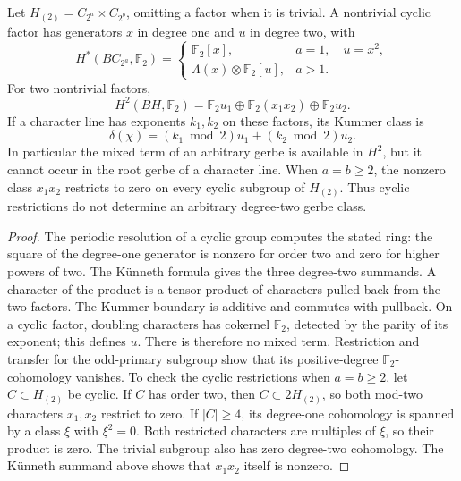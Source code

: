 \begin{proposition}
\label{prop:finite-stabilizer-two-primary-class}
\label{prop:finite-stabilizer-two-primary-mixed-term}
\label{prop:finite-stabilizer-odd-transfer}
Let \(H_{(2)}=C_{2^a}\times C_{2^b}\), omitting a factor when it is
trivial.  A nontrivial cyclic factor has generators \(x\) in degree
one and \(u\) in degree two, with
\[
 H^*(BC_{2^a},\mathbb F_2)=
 \begin{cases}
 \mathbb F_2[x],&a=1,\quad u=x^2,\\
 \Lambda(x)\otimes\mathbb F_2[u],&a>1.
 \end{cases}
\]
For two nontrivial factors,
\[
 H^2(BH,\mathbb F_2)
 =\mathbb F_2u_1\oplus\mathbb F_2(x_1x_2)
  \oplus\mathbb F_2u_2.
\]
If a character line has exponents \(k_1,k_2\) on these factors,
its Kummer class is
\[
 \delta(\chi)=(k_1\bmod2)u_1+(k_2\bmod2)u_2.
\]
In particular the mixed term of an arbitrary gerbe is available in
\(H^2\), but it cannot occur in the root gerbe of a character line.
When \(a=b\ge2\), the nonzero class \(x_1x_2\) restricts to zero
on every cyclic subgroup of \(H_{(2)}\).  Thus cyclic restrictions
do not determine an arbitrary degree-two gerbe class.
\end{proposition}
\begin{proof}
The periodic resolution of a cyclic group computes the stated ring:
the square of the degree-one generator is nonzero for order two and
zero for higher powers of two.  The K\"unneth formula gives the three
degree-two summands.  A character of the product is a tensor product
of characters pulled back from the two factors.  The Kummer boundary
is additive and commutes with pullback.  On a cyclic factor, doubling
characters has cokernel \(\mathbb F_2\), detected by the parity of
its exponent; this defines \(u\).  There is therefore no mixed term.
Restriction and transfer for the odd-primary subgroup show that its
positive-degree \(\mathbb F_2\)-cohomology vanishes.
To check the cyclic restrictions when \(a=b\ge2\), let
\(C\subset H_{(2)}\) be cyclic.  If \(C\) has order two, then
\(C\subset2H_{(2)}\), so both mod-two characters \(x_1,x_2\)
restrict to zero.  If \(|C|\ge4\), its degree-one cohomology is
spanned by a class \(\xi\) with \(\xi^2=0\).  Both restricted
characters are multiples of \(\xi\), so their product is zero.
The trivial subgroup also has zero degree-two cohomology.  The
K\"unneth summand above shows that \(x_1x_2\) itself is nonzero.
\end{proof}

